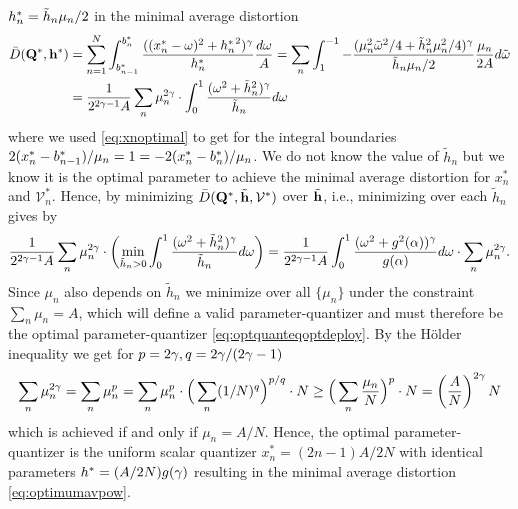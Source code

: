 \documentclass[smallabstract,smallcaptions]{dccpaper}
\renewcommand{\vP}{\mathbf Q}
\newcommand{\Vor}{\ensuremath{\mathcal{V}}}         %
\newcommand{\Dis}{\ensuremath{D}}                    %
\newcommand{\AvDis}{\ensuremath{\bar{\Dis}}}         %
\begin{document}
  $h^{*}_n=\tilde{h}_n\mu_n/2$  in the minimal average distortion 
  \begin{align}
    \AvDis(\vP^*,\vh^*)&=\sum_{n=1}^N \int_{b_{n-1}^*}^{b_n^*} 
       \frac{ ((\pGlob_n-\ome)^2+{\hGlob_n}^2)^{\gam}}{\hGlob_n}\frac{d\ome}{A} 
       = \sum_n \int_{1}^{-1} -\frac{  (\mu_n^2 \tome^2/4 + \tilde{h}_n^2\mu_n^2/4)^{\gam}}{\tilde{h}_n\mu_n/2}
    \frac{\mu_n}{2A}d\tome\notag\\
    &= \frac{1}{ 2^{2\gam-1}A}\sum_n \mu_n^{2\gam}\cdot\int_0^1 \frac{(\ome^2+\tilde{h}^2_n)^{\gam}}{\tilde{h}_n}d \ome 
  \end{align}
  where we used \eqref{eq:xnoptimal} to get for the integral boundaries $2(x^{*}_n-b_{n-1}^*)/\mu_n=1=-2(x^{*}_n-b_{n}^*)/\mu_n$.
  We do not know the value of $\tilde{h}_n$ but we know it is the optimal parameter to achieve the minimal average
  distortion for $x_n^*$ and $\Vor_n^*$. Hence, by minimizing $\AvDis(\vP^*,\tilde{\vh},\Vor^*)$ over
  $\tilde{{\mathbf h}}$, i.e., minimizing over each $\tilde{h}_n$ gives by  
  \begin{align}
    \frac{1}{2^{2\gamma-1}A}
    \sum_n \mu_n^{2\gamma}\cdot\left(\min_{\tilde{h}_n>0}\int_0^1 \frac{(\omega^2+\tilde{h}^2_n)^{\gamma}}{\tilde{h}_n}d \omega\right)
    =\frac{1}{2^{2\gamma-1}A}\int_0^1 \frac{(\omega^2+g^2(\alpha))^{\gamma}}{g(\alpha)}d\omega \cdot  \sum_n\mu_n^{2\gamma}\notag.
  \end{align}
  Since $\mu_n$ also depends on $\tilde{h}_n$ we minimize over all $\{\mu_n\}$ under the constraint $\sum_n\mu_n=A$,
  which will define a valid parameter-quantizer and must therefore be the optimal parameter-quantizer
  \eqref{eq:optquanteqoptdeploy}. By the Hölder inequality we get for $p=2\gamma, q=2\gamma/(2\gamma-1)$ 
  \begin{align}
    \sum_n \mu_n^{2\gamma}=\sum_n \mu_n^p  = \sum_n \mu_n^p \cdot\Big(\sum_n (1/N)^q \Big)^{p/q} \cdot N
    \geq\Big( \sum_n \frac{\mu_n }{N}\Big)^p \cdot N =
    \left(\frac{A}{N}\right)^{2\gamma}N\notag
  \end{align}
  which is achieved if and only if $\mu_n=A/N$. Hence, the optimal parameter-quantizer is the 
  uniform scalar quantizer $x_n^*=(2n-1)A/2N$ with identical parameters $h^*=(A/2N)g(\gamma)$ resulting in the
  minimal average distortion \eqref{eq:optimumavpow}.

\fi
\end{document}
